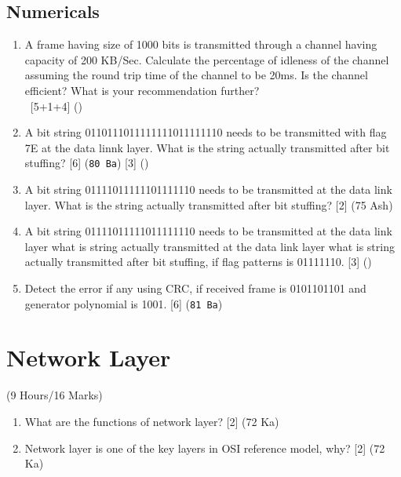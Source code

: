 \documentclass[12pt]{article}
\newcommand{\enter}{\\\textcolor{white}{1}}
\begin{document}
	\subsection{Numericals}
		\begin{enumerate}[noitemsep, topsep=0pt]
			\item A frame having size of 1000 bits is transmitted through a channel having capacity of 200 KB/Sec. Calculate the percentage of idleness of the channel assuming the round trip time of the channel to be 20ms. Is the channel efficient? What is your recommendation further?
			\enter\hfill [5+1+4] () 

			\item A bit string 0110111011111111011111110 needs to be transmitted with flag 7E at the data linnk layer. What is the string actually transmitted after bit stuffing? \hfill [6] (\texttt{80 Ba}) [3] ()

			\item A bit string 01111011111101111110 needs to be transmitted at the data link layer. What is the string actually transmitted after bit stuffing? \hfill [2] (75 Ash)

			\item A bit string 01111011111011111110 needs to be transmitted at the data link layer what is string actually transmitted at the data  link layer what is string actually transmitted after bit stuffing, if flag patterns is 01111110. \hfill [3] ()
			
			\item Detect the error if any using CRC, if received frame is 0101101101 and generator polynomial is 1001. \hfill [6] (\texttt{81 Ba})
		\end{enumerate}

	\pagebreak

\section{Network Layer}
	\begin{center}(9 Hours/16 Marks)\end{center}
	\begin{enumerate}[noitemsep, topsep=0pt]
		\item What are the functions of network layer? \hfill [2] (72 Ka)
		\item Network layer is one of the key layers in OSI reference model, why? \hfill [2] (72 Ka)
	\end{enumerate}
\end{document}
